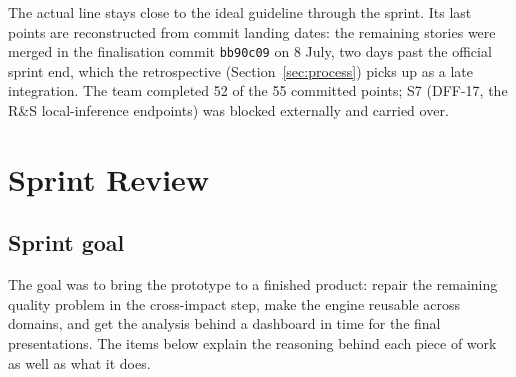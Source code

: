 \documentclass[11pt,a4paper]{article}
\newcommand{\code}[1]{\texttt{\small #1}}
\begin{document}
The actual line stays close to the ideal guideline through the sprint. Its last points are reconstructed
from commit landing dates: the remaining stories were merged in the finalisation commit \code{bb90c09} on
8 July, two days past the official sprint end, which the retrospective (Section~\ref{sec:process}) picks up
as a late integration. The team completed 52 of the 55 committed points; S7 (DFF-17, the R\&S local-inference
endpoints) was blocked externally and carried over.

\section{Sprint Review}
\subsection*{Sprint goal}
The goal was to bring the prototype to a finished product: repair the remaining quality problem in the
cross-impact step, make the engine reusable across domains, and get the analysis behind a dashboard in time
for the final presentations. The items below explain the reasoning behind each piece of work as well as what
it does.
\end{document}

